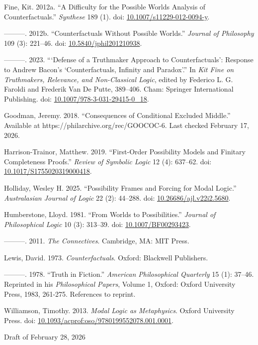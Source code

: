 \documentclass[
  11pt,
  letterpaper,
  DIV=11,
  numbers=noendperiod,
  twoside]{scrartcl}
\newlength{\cslhangindent}
\newenvironment{CSLReferences}[2] %
 {\begin{list}{}{%
  \setlength{\itemindent}{0pt}
  \setlength{\leftmargin}{0pt}
  \setlength{\parsep}{0pt}
  \ifodd #1
   \setlength{\leftmargin}{\cslhangindent}
   \setlength{\itemindent}{-1\cslhangindent}
  \fi
  \setlength{\itemsep}{#2\baselineskip}}}
 {\end{list}}
\begin{document}
\begin{CSLReferences}{1}{0}
Fine, Kit. 2012a. {``A Difficulty for the Possible Worlds Analysis of
Counterfactuals.''} \emph{Synthese} 189 (1). doi:
\href{https://doi.org/10.1007/s11229-012-0094-y}{10.1007/s11229-012-0094-y}.

---------. 2012b. {``Counterfactuals Without Possible Worlds.''}
\emph{Journal of Philosophy} 109 (3): 221--46. doi:
\href{https://doi.org/10.5840/jphil201210938}{10.5840/jphil201210938}.

---------. 2023. {``{`Defense of a Truthmaker Approach to
Counterfactuals'}: Response to Andrew Bacon's {`Counterfactuals,
Infinity and Paradox'}.''} In \emph{Kit Fine on Truthmakers, Relevance,
and Non-Classical Logic}, edited by Federico L. G. Faroldi and Frederik
Van De Putte, 389--406. Cham: Springer International Publishing. doi:
\href{https://doi.org/10.1007/978-3-031-29415-0_18}{10.1007/978-3-031-29415-0\_18}.

Goodman, Jeremy. 2018. {``Consequences of Conditional Excluded
Middle.''} Available at https://philarchive.org/rec/GOOCOC-6. Last
checked February 17, 2026.

Harrison-Trainor, Matthew. 2019. {``First-Order Possibility Models and
Finitary Completeness Proofs.''} \emph{Review of Symbolic Logic} 12 (4):
637--62. doi:
\href{https://doi.org/10.1017/S1755020319000418}{10.1017/S1755020319000418}.

Holliday, Wesley H. 2025. {``Possibility Frames and Forcing for Modal
Logic.''} \emph{Australasian Journal of Logic} 22 (2): 44--288. doi:
\href{https://doi.org/10.26686/ajl.v22i2.5680}{10.26686/ajl.v22i2.5680}.

Humberstone, Lloyd. 1981. {``From Worlds to Possibilities.''}
\emph{Journal of Philosophical Logic} 10 (3): 313--39. doi:
\href{https://doi.org/10.1007/BF00293423}{10.1007/BF00293423}.

---------. 2011. \emph{The Connectives}. Cambridge, MA: MIT Press.

Lewis, David. 1973. \emph{Counterfactuals}. Oxford: Blackwell
Publishers.

---------. 1978. {``Truth in Fiction.''} \emph{American Philosophical
Quarterly} 15 (1): 37--46. Reprinted in his \emph{Philosophical Papers},
Volume 1, Oxford: Oxford University Press, 1983, 261-275. References to
reprint.

Williamson, Timothy. 2013. \emph{Modal Logic as Metaphysics}. Oxford
University Press. doi:
\href{https://doi.org/10.1093/acprof:oso/9780199552078.001.0001}{10.1093/acprof:oso/9780199552078.001.0001}.

\end{CSLReferences}



Draft of February 28, 2026
\end{document}
